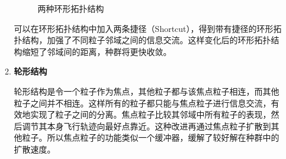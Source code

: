 \begin{enumerate}
\begin{enumerate}
\begin{figure}[htbp]
{\begin{minipage}[b]{0.46\linewidth}
			\end{minipage}}
		\caption{两种环形拓扑结构}
		\end{figure}
		
		\hspace{2em}可以在环形拓扑结构中加入两条捷径（Shortcut），得到带有捷径的环形拓扑结构，加强了不同粒子邻域之间的信息交流。这样变化后的环形拓扑结构缩短了邻域间的距离，种群将更快收敛。
%		
		\item \textbf{轮形结构}
		
		\hspace{2em}轮形结构是令一个粒子作为焦点，其他粒子都与该焦点粒子相连，而其他粒子之间并不相连。这样所有的粒子都只能与焦点粒子进行信息交流，有效地实现了粒子之间的分离。焦点粒子比较其邻域中所有粒子的表现，然后调节其本身飞行轨迹向最好点靠近。这种改进再通过焦点粒子扩散到其他粒子。所以焦点粒子的功能类似一个缓冲器，缓解了较好解在种群中的扩散速度。
		

\end{enumerate}
\end{enumerate}
